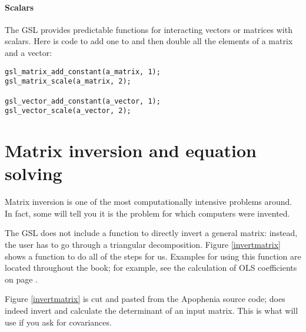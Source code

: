 

\paragraph{Scalars} The GSL provides predictable functions for
interacting vectors or matrices with scalars. Here is code to add one to
and then double all the elements of a matrix and a vector:
\begin{lstlisting}
gsl_matrix_add_constant(a_matrix, 1);
gsl_matrix_scale(a_matrix, 2);

gsl_vector_add_constant(a_vector, 1);
gsl_vector_scale(a_vector, 2);
\end{lstlisting}
 
 

\section{Matrix inversion and equation solving}  
Matrix inversion is one of the most computationally intensive problems
around. In fact, some will tell you it is the problem for which computers were invented.


The GSL does not include a function to directly invert a general matrix:
instead, the user has to go through a triangular decomposition. Figure
\ref{invertmatrix} shows a function to do all of the steps for us.
Examples for using this function are located throughout the book; for
example, see the calculation of OLS coefficients on page \pageref{ols}.

Figure \ref{invertmatrix} is cut and pasted from the Apophenia source
code;  does indeed invert and calculate the
determinant of an input matrix. This is what  will use if
you ask for covariances.


